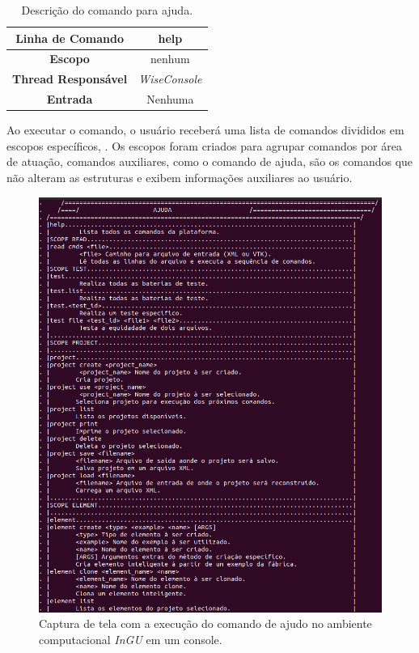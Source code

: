 \begin{center}
	\begin{table}[!htbp]
		\begin{tabularx}{\textwidth}{c|X}
			\toprule
			\textbf{Linha de Comando} & \multicolumn{1}{c}{help} \\
			\midrule
			\textbf{Escopo} & \multicolumn{1}{c}{nenhum} \\
			\hline
			\textbf{Thread Responsável} & \multicolumn{1}{c}{\textit{WiseConsole}} \\
			\hline
			\textbf{Entrada} & \multicolumn{1}{c}{Nenhuma} \\
			\bottomrule
		\end{tabularx}
		\caption{Descrição do comando para ajuda.}
		\label{tab:help}
	\end{table}
\end{center}

Ao executar o comando, o usuário receberá uma lista de comandos divididos em escopos específicos, . Os escopos foram criados para agrupar comandos por área de atuação, comandos auxiliares, como o comando de ajuda, são os comandos que não alteram as estruturas e exibem informações auxiliares ao usuário.


\begin{figure}[!htbp]
	\centering
	\includegraphics[scale=0.45]{Figures/InGU_help.png}
	\caption{Captura de tela com a execução do comando de ajudo no ambiente computacional \textit{InGU} em um console.}
	\label{fig10:ajuda}
\end{figure}


